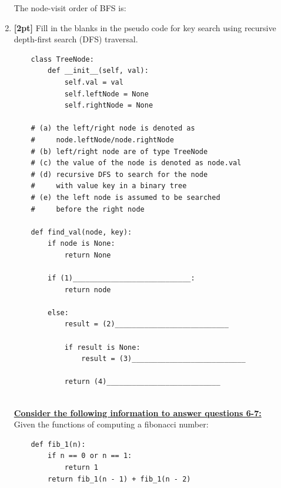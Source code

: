\documentclass[12pt]{article}
\begin{document}
\begin{enumerate}
    \begin{tcolorbox}[fit,height=1cm, width=\textwidth, blank, borderline={1pt}{-2pt},nobeforeafter]
    \end{tcolorbox}
    
    The node-visit order of BFS is:
    
    \begin{tcolorbox}[fit,height=1cm, width=\textwidth, blank, borderline={1pt}{-2pt},nobeforeafter]
    \end{tcolorbox}
    

    
    \clearpage

    \item \textbf{[2pt]} Fill in the blanks in the pseudo code for key search using recursive depth-first search (DFS) traversal.
    
    \begin{lstlisting}
    class TreeNode:
        def __init__(self, val):
            self.val = val
            self.leftNode = None
            self.rightNode = None
        
    # (a) the left/right node is denoted as
    #     node.leftNode/node.rightNode
    # (b) left/right node are of type TreeNode
    # (c) the value of the node is denoted as node.val
    # (d) recursive DFS to search for the node 
    #     with value key in a binary tree
    # (e) the left node is assumed to be searched 
    #     before the right node
        
    def find_val(node, key):
        if node is None:
            return None
            
        if (1)____________________________:
            return node
            
        else:
            result = (2)___________________________
            
            if result is None:
                result = (3)___________________________
                
            return (4)___________________________
                
    \end{lstlisting}
    
    
    
    \newpage
    \textbf{\underline{Consider the following information to answer questions 6-7:}} \\
    Given the functions of computing a fibonacci number:
    \begin{lstlisting}
    def fib_1(n):
        if n == 0 or n == 1:
            return 1
        return fib_1(n - 1) + fib_1(n - 2)
        

\end{lstlisting}
\end{enumerate}
\end{document}
